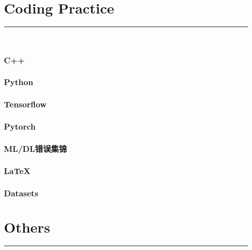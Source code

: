 \documentclass{article}
\begin{document}
\clearpage
\part{Coding Practice}
{\noindent}	 \rule[-10pt]{17.5cm}{0.5em}\\
\section{C++}


\section{Python}


\section{Tensorflow}


\section{Pytorch}


\section{ML/DL错误集锦}

%
\section{\LaTeX}


\section{Datasets}



\clearpage
\part{Others}
{\noindent}	 \rule[-10pt]{17.5cm}{0.5em}\\
\end{document}
